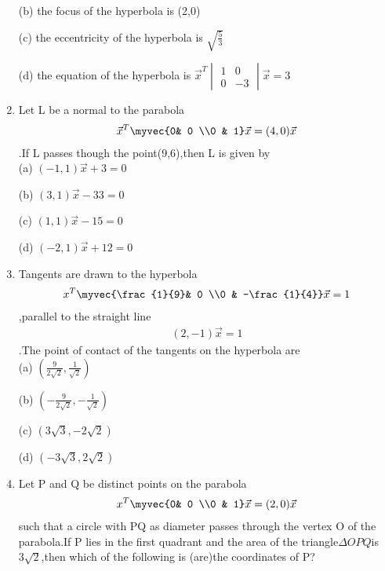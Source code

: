 \begin{enumerate}
    \choice (b) the focus of the hyperbola is (2,0)
    
    \choice (c) the eccentricity of the hyperbola is $\sqrt{\frac{5}{3}}$
    
    \choice (d) the equation of the hyperbola is $\vec x^T \begin{vmatrix}
    1& 0 \\0 & -3 \end{vmatrix} \vec x=3$\\
    
    \item Let L be a normal to the parabola \begin{align}\vec x^T \myvec{0& 0 \\0 & 1}\vec x=(4,0)\vec x\end{align}.If L passes though the point(9,6),then L is given by\\
    
     \choice (a) $(-1,1)\vec x+3=0$
     
     \choice (b) $(3,1)\vec x-33=0$
     
     \choice (c) $(1,1)\vec x-15=0$
     
     \choice (d) $(-2,1)\vec x+12=0$\\
     
     \item Tangents are drawn to the hyperbola \begin{align} x^T \myvec{\frac{1}{9}& 0 \\0 & -\frac{1}{4}}\vec x=1\end{align},parallel to the straight line \begin{align}(2,-1)\vec x=1\end{align}.The point of contact of the tangents on the hyperbola are \\
    
    \choice (a) $(\frac{9}{2\sqrt{2}},\frac{1}{\sqrt{2}})$
    
    \choice (b) $(-\frac{9}{2\sqrt{2}},-\frac{1}{\sqrt{2}})$
    
    \choice (c) $(3\sqrt{3},-2\sqrt{2})$
    
    \choice (d) $(-3\sqrt{3},2\sqrt{2})$\\
    
    \item Let P and Q be distinct points on the parabola \begin{align} x^T \myvec{0& 0 \\0 & 1}\vec x=(2,0)\vec x\end{align}such that a circle with PQ as diameter passes through the vertex O of the parabola.If P lies in the first quadrant and the area of the triangle$ \Delta OPQ $is $3\sqrt{2}$,then which of the following is (are)the coordinates of P?\\
    

\end{enumerate}
